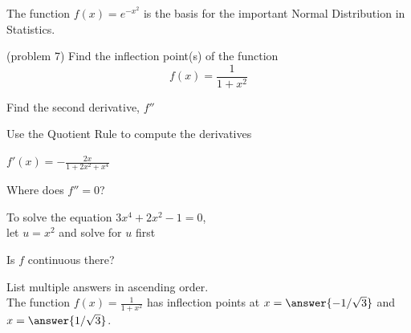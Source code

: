 \documentclass[handout]{ximera}
\begin{document}
\begin{example}[example 7]
\begin{image}
\end{image}
The function $f(x) = e^{-x^2}$ is the basis for the important Normal Distribution in Statistics.
\end{example}

\begin{problem}(problem 7)
  Find the inflection point(s) of the function
  \[
     f(x) = \frac{1}{1+x^2}
  \]
 
    \begin{hint}
      Find the second derivative, $f''$
    \end{hint}
    \begin{hint}
      Use the Quotient Rule to compute the derivatives
    \end{hint}
		\begin{hint}
      $f'(x) = -\frac{2x}{1+2x^2+x^4}$
    \end{hint}
		\begin{hint}
      Where does $f'' = 0$?
    \end{hint}
		\begin{hint}
		 To solve the equation $3x^4 + 2x^2 - 1 = 0$, \\
		 let $u = x^2$ and solve for $u$ first
    \end{hint}
		\begin{hint}
      Is $f$ continuous there?
    \end{hint}  
		List multiple answers in ascending order.\\
		The function $f(x) = \frac{1}{1+x^2}$ has inflection 
		points at $x =\answer{-1/\sqrt 3}$ and $x=\answer{1/\sqrt 3}$.
		
		
\end{problem}
\end{document}

